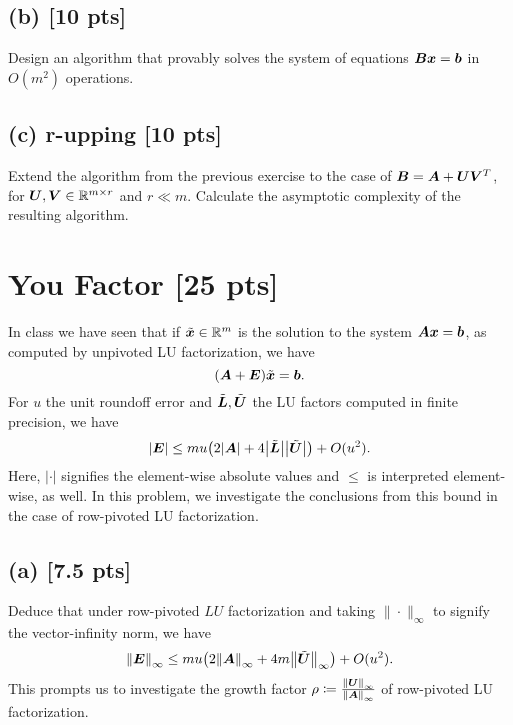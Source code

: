 \documentclass[twoside,10pt]{article}
\begin{document}
\subsection*{(b) [10 pts]} 
Design an algorithm that provably solves the system of equations $\bm{B} \bm{x} = \bm{b}$ in $O(m^2)$ operations. 

\subsection*{(c) r-upping [10 pts]}
Extend the algorithm from the previous exercise to the case of $\bm{B} = \bm{A} + \bm{U}\bm{V}^{T}$, for $\bm{U},\bm{V} \in \mathbb{R}^{m \times r}$ and $r \ll m$.
Calculate the asymptotic complexity of the resulting algorithm.

\section{You Factor [25 pts]}
In class we have seen that if $\tilde{\bm{x}} \in \mathbb{R}^{m}$ is the solution to the system $\bm{A}\bm{x} = \bm{b}$, as computed by unpivoted LU factorization, we have  
\begin{equation}
  \left(\mtx{A} + \mtx{E}\right)\tilde{\vct{x}} = \vct{b}.  
\end{equation}
For $u$ the unit roundoff error and $\tilde{\bm{L}}, \tilde{\bm{U}}$ the LU factors computed in finite precision, we have
\begin{equation}
  \left|\mtx{E}\right| \leq m u \left(2 \left|\mtx{A}\right| + 4 \left|\tilde{\mtx{L}} \right| \left|\tilde{\mtx{U}}\right|\right) + O(u^2).
\end{equation}
Here, $|\cdot|$ signifies the element-wise absolute values and $\leq$ is interpreted element-wise, as well.
In this problem, we investigate the conclusions from this bound in the case of row-pivoted LU factorization.

\subsection*{(a) [7.5 pts]}
Deduce that under row-pivoted $LU$ factorization and taking $\| \cdot \|_{\infty}$ to signify the vector-infinity norm, we have 
\begin{equation}
  \left\|\mtx{E}\right\|_{\infty} \leq m u \left(2 \left\|\mtx{A}\right\|_{\infty} + 4 m \left\|\tilde{\mtx{U}}\right\|_{\infty} \right) + O(u^2).
\end{equation}
This prompts us to investigate the growth factor $\rho \coloneqq \frac{\left\| \mtx{U} \right\|_{\infty}}{\left\|\mtx{A}\right\|_{\infty}}$ of row-pivoted LU factorization.
\end{document}
